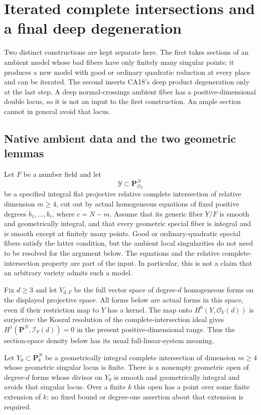 \section{Iterated complete intersections and a final deep degeneration}
\label{r18ce:section}

Two distinct constructions are kept separate here.  The first takes
sections of an ambient model whose bad fibers have only finitely
many singular points; it produces a new model with good or ordinary
quadratic reduction at every place and can be iterated.  The second
inserts CA18's deep product degeneration only at the last step.
A deep normal-crossings ambient fiber has a positive-dimensional
double locus, so it is not an input to the first construction.
An ample section cannot in general avoid that locus.

\subsection{Native ambient data and the two geometric lemmas}

Let $F$ be a number field and let
\[
       \mathcal Y\subset\mathbf P^N_{\mathcal O_F}
 \tag{CE18.1}\label{r18ce:ambient}
\]
be a specified integral flat projective relative complete
intersection of relative dimension $m\ge4$, cut out by actual
homogeneous equations of fixed positive degrees
$b_1,\ldots,b_c$, where $c=N-m$.
Assume that its generic fiber $Y/F$ is smooth and geometrically
integral, and that every geometric special fiber is integral
and is smooth except at finitely many points.
Good or ordinary-quadratic special fibers satisfy the latter
condition, but the ambient local singularities do not need to
be resolved for the argument below.  The equations and the
relative complete-intersection property are part of the input.
In particular, this is not a claim that an arbitrary variety
admits such a model.

Fix $d\ge3$ and let $V_{d,F}$ be the full vector space of
degree-$d$ homogeneous forms on the displayed projective space.
All forms below are actual forms in this space, even if their
restriction map to $Y$ has a kernel.
The map onto $H^0(Y,\mathcal O_Y(d))$ is surjective: the
Koszul resolution of the complete-intersection ideal gives
$H^1(\mathbf P^N,\mathcal I_Y(d))=0$ in the present
positive-dimensional range.  Thus the section-space density
below has its usual full-linear-system meaning.

\begin{lemma}
\label{r18ce:residue-Bertini}
Let $Y_0\subset\mathbf P^N_k$ be a geometrically integral
complete intersection of dimension $m\ge4$ whose geometric
singular locus is finite.  There is a nonempty geometric open
of degree-$d$ forms whose divisor on $Y_0$ is smooth and
geometrically integral and avoids that singular locus.
Over a finite $k$ this open has a point over some finite
extension of $k$; no fixed bound or degree-one assertion
about that extension is required.
\end{lemma}

